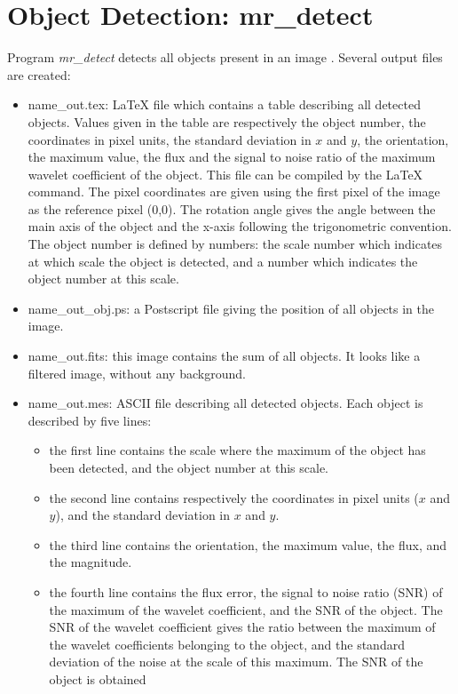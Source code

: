 \section{Object Detection:  mr\_detect}
Program {\em mr\_detect} detects all objects present in 
an image \cite{ima:bijaoui95,ima:rue97}.
Several output files are created:
\begin{itemize}
\item name\_out.tex: LaTeX file which contains a table describing all detected
objects. Values given in the 
table are respectively the object number, the coordinates in pixel units, 
the standard deviation in $x$ and $y$, the orientation, the maximum value, 
the flux and the signal to noise ratio of
 the maximum wavelet coefficient of the object. This file
can be compiled by the LaTeX command. The pixel coordinates are given
using the first pixel of the image as the reference pixel (0,0).
The rotation angle gives the angle between the main axis of the object
and the x-axis following the trigonometric convention. The object number is
defined by numbers: the scale number which indicates at which  scale
the object is detected, and a number which indicates the object number
at this scale.
\item name\_out\_obj.ps: a Postscript file giving the position
of all objects in the image.
\item name\_out.fits: this image contains the sum of all objects. It looks
like a filtered image, without any background.
\item name\_out.mes: ASCII file describing all detected objects. Each object
is described by five lines: 
\begin{itemize}
\item the first line contains the scale where the maximum of the object has
been detected, and the object number at this scale.
\item the second line contains respectively the coordinates 
in pixel units ($x$ and $y$), and the standard deviation in $x$ and $y$.
\item the third line contains the orientation, the maximum value, the flux,
and the magnitude.
\item the fourth line contains the flux error, the signal to noise 
ratio (SNR) of the
maximum of the wavelet coefficient, and the SNR of the object.
The SNR of the wavelet coefficient gives the ratio between the maximum 
of the wavelet coefficients belonging to the object, and the standard deviation
of the noise at the scale of this maximum. The SNR of the object is obtained

\end{itemize}
\end{itemize}
